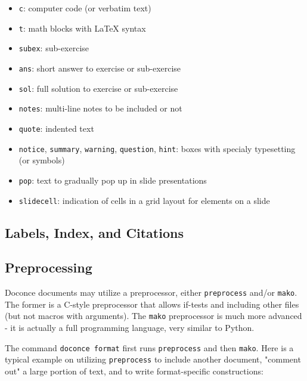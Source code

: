 \documentclass[%
oneside,                 %
final,                   %
10pt]{article}
\begin{document}
\begin{itemize}
 \item \Verb!c!: computer code (or verbatim text)

 \item \Verb!t!: math blocks with {\LaTeX} syntax

 \item \Verb!subex!: sub-exercise

 \item \Verb!ans!: short answer to exercise or sub-exercise

 \item \Verb!sol!: full solution to exercise or sub-exercise

 \item \Verb!notes!: multi-line notes to be included or not

 \item \Verb!quote!: indented text

 \item \Verb!notice!, \Verb!summary!, \Verb!warning!, \Verb!question!, \Verb!hint!: boxes with
    specialy typesetting (or symbols)

 \item \Verb!pop!: text to gradually pop up in slide presentations

 \item \Verb!slidecell!: indication of cells in a grid layout for elements on a
   slide
\end{itemize}

\noindent

\subsection{Labels, Index, and Citations}

\subsection{Preprocessing}

Doconce documents may utilize a preprocessor, either \Verb!preprocess! and/or
\Verb!mako!. The former is a C-style preprocessor that allows if-tests
and including other files (but not macros with arguments).
The \Verb!mako! preprocessor is much more advanced - it is actually a full
programming language, very similar to Python.

The command \Verb!doconce format! first runs \Verb!preprocess! and then \Verb!mako!.
Here is a typical example on utilizing \Verb!preprocess! to include another
document, "comment out" a large portion of text, and to write format-specific
constructions:
\end{document}
